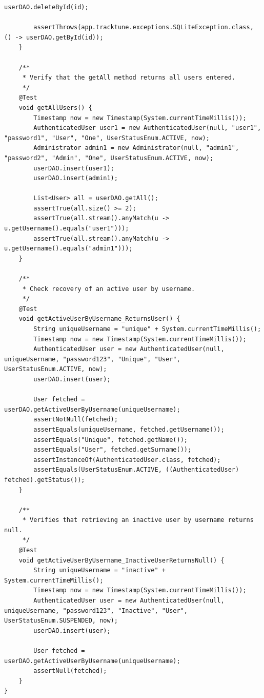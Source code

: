 \documentclass[a4paper]{article}
\begin{document}
\begin{lstlisting}[style=java-style, caption={Esempio test per la classe \texttt{UserTest.java}}]
        userDAO.deleteById(id);

        assertThrows(app.tracktune.exceptions.SQLiteException.class, () -> userDAO.getById(id));
    }

    /**
     * Verify that the getAll method returns all users entered.
     */
    @Test
    void getAllUsers() {
        Timestamp now = new Timestamp(System.currentTimeMillis());
        AuthenticatedUser user1 = new AuthenticatedUser(null, "user1", "password1", "User", "One", UserStatusEnum.ACTIVE, now);
        Administrator admin1 = new Administrator(null, "admin1", "password2", "Admin", "One", UserStatusEnum.ACTIVE, now);
        userDAO.insert(user1);
        userDAO.insert(admin1);

        List<User> all = userDAO.getAll();
        assertTrue(all.size() >= 2);
        assertTrue(all.stream().anyMatch(u -> u.getUsername().equals("user1")));
        assertTrue(all.stream().anyMatch(u -> u.getUsername().equals("admin1")));
    }

    /**
     * Check recovery of an active user by username.
     */
    @Test
    void getActiveUserByUsername_ReturnsUser() {
        String uniqueUsername = "unique" + System.currentTimeMillis();
        Timestamp now = new Timestamp(System.currentTimeMillis());
        AuthenticatedUser user = new AuthenticatedUser(null, uniqueUsername, "password123", "Unique", "User", UserStatusEnum.ACTIVE, now);
        userDAO.insert(user);

        User fetched = userDAO.getActiveUserByUsername(uniqueUsername);
        assertNotNull(fetched);
        assertEquals(uniqueUsername, fetched.getUsername());
        assertEquals("Unique", fetched.getName());
        assertEquals("User", fetched.getSurname());
        assertInstanceOf(AuthenticatedUser.class, fetched);
        assertEquals(UserStatusEnum.ACTIVE, ((AuthenticatedUser) fetched).getStatus());
    }

    /**
     * Verifies that retrieving an inactive user by username returns null.
     */
    @Test
    void getActiveUserByUsername_InactiveUserReturnsNull() {
        String uniqueUsername = "inactive" + System.currentTimeMillis();
        Timestamp now = new Timestamp(System.currentTimeMillis());
        AuthenticatedUser user = new AuthenticatedUser(null, uniqueUsername, "password123", "Inactive", "User", UserStatusEnum.SUSPENDED, now);
        userDAO.insert(user);

        User fetched = userDAO.getActiveUserByUsername(uniqueUsername);
        assertNull(fetched);
    }
}
\end{lstlisting}
\end{document}
